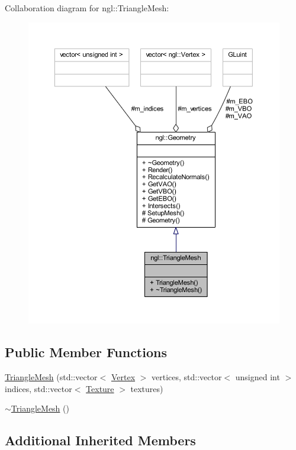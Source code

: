 Collaboration diagram for ngl\+:\+:Triangle\+Mesh\+:
\nopagebreak
\begin{figure}[H]
\begin{center}
\leavevmode
\includegraphics[width=350pt]{classngl_1_1_triangle_mesh__coll__graph}
\end{center}
\end{figure}
\subsection*{Public Member Functions}
\begin{DoxyCompactItemize}
\item 
\mbox{\hyperlink{classngl_1_1_triangle_mesh_ab0c344f81dc7b9c8a4f26cc1ecb0f0bf}{Triangle\+Mesh}} (std\+::vector$<$ \mbox{\hyperlink{structngl_1_1_vertex}{Vertex}} $>$ vertices, std\+::vector$<$ unsigned int $>$ indices, std\+::vector$<$ \mbox{\hyperlink{classngl_1_1_texture}{Texture}} $>$ textures)
\item 
\mbox{\hyperlink{classngl_1_1_triangle_mesh_ad5be3d6abe081e05362f358c9bc556d8}{$\sim$\+Triangle\+Mesh}} ()
\end{DoxyCompactItemize}
\subsection*{Additional Inherited Members}


